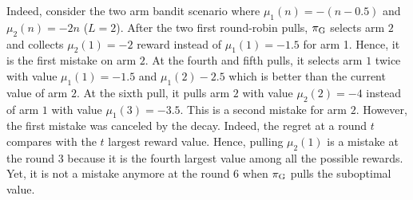 Indeed, consider the two arm bandit scenario where $\mu_1(n) = -(n-0.5)$ and $\mu_2(n) = -2n$ ($L=2$). After the two first round-robin pulls, $\pi_{\rm G}$ selects arm $2$ and collects $\mu_2(1)=-2$ reward instead of $\mu_1(1)= -1.5$ for arm 1. Hence, it is the first mistake on arm $2$. At the fourth and fifth pulls, it selects arm $1$ twice with value $\mu_1(1) = -1.5$ and $\mu_1(2)-2.5$ which is better than the current value of arm $2$. At the sixth pull, it pulls arm $2$ with value $\mu_2(2) = -4$ instead of arm $1$ with value $\mu_1(3)=-3.5$. This is a second mistake for arm $2$. However, the first mistake was canceled by the decay. Indeed, the regret at a round $t$ compares with the $t$ largest reward value. Hence, pulling $\mu_2(1)$ is a mistake at the round $3$ because it is the fourth largest value among all the possible rewards. Yet, it is not a mistake anymore at the round $6$ when $\pi_{\rm G}$ pulls the suboptimal value.

